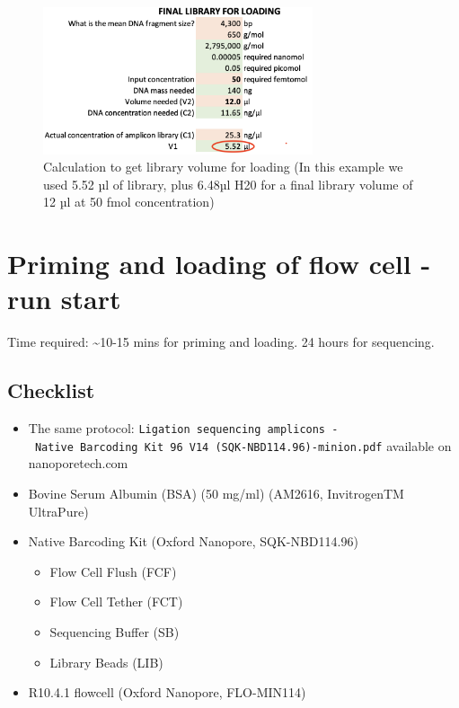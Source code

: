 \documentclass[
]{book}
\providecommand{\tightlist}{%
  \setlength{\itemsep}{0pt}\setlength{\parskip}{0pt}}
\begin{document}
\hfill\break

\begin{figure}
\centering
\includegraphics[width=3.125in,height=\textheight]{./img/libraryprepsminDNA.png}
\caption{Calculation to get library volume for loading (In this example we used 5.52 µl of library, plus 6.48µl H20 for a final library volume of 12 µl at 50 fmol concentration)}
\end{figure}

\section{Priming and loading of flow cell - run start}\label{priming-and-loading-of-flow-cell---run-start}

Time required: \textasciitilde10-15 mins for priming and loading. 24 hours for sequencing.

\subsection{Checklist}\label{checklist-4}

\begin{itemize}
\tightlist
\item
  The same protocol: \texttt{Ligation\ sequencing\ amplicons\ -\ Native\ Barcoding\ Kit\ 96\ V14\ (SQK-NBD114.96)-minion.pdf} available on nanoporetech.com
\item
  Bovine Serum Albumin (BSA) (50 mg/ml) (AM2616, InvitrogenTM UltraPure)
\item
  Native Barcoding Kit (Oxford Nanopore, SQK-NBD114.96)

  \begin{itemize}
  \tightlist
  \item
    Flow Cell Flush (FCF)
  \item
    Flow Cell Tether (FCT)
  \item
    Sequencing Buffer (SB)
  \item
    Library Beads (LIB)
  \end{itemize}
\item
  R10.4.1 flowcell (Oxford Nanopore, FLO-MIN114)
\end{itemize}
\end{document}
